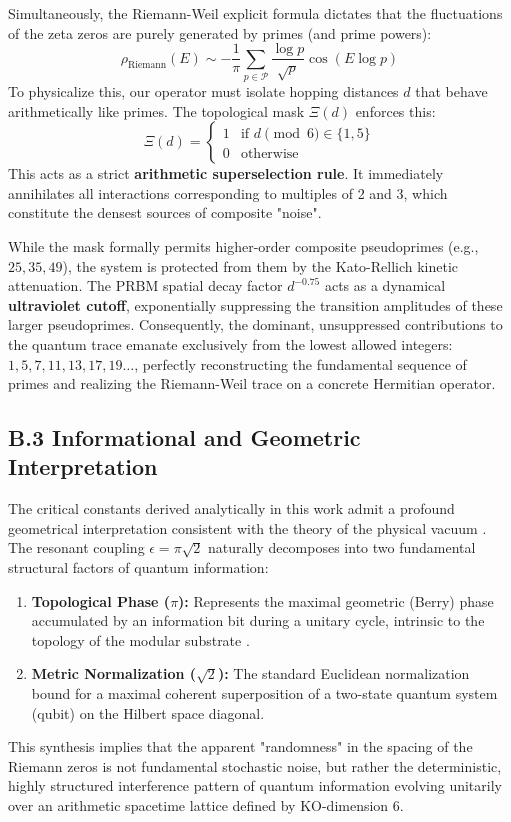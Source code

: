 \documentclass[prl,aps,floatfix,superscriptaddress,10pt]{revtex4-2}
\begin{document}
Simultaneously, the Riemann-Weil explicit formula dictates that the fluctuations of the zeta zeros are purely generated by primes (and prime powers):
\begin{equation}
\rho_{\text{Riemann}}(E) \sim -\frac{1}{\pi} \sum_{p \in \mathcal{P}} \frac{\log p}{\sqrt{p}} \cos(E \log p)
\end{equation}
To physicalize this, our operator must isolate hopping distances $d$ that behave arithmetically like primes. The topological mask $\Xi(d)$ enforces this:
\begin{equation}
\Xi(d) = \begin{cases} 1 & \text{if } d \pmod 6 \in \{1, 5\} \\ 0 & \text{otherwise} \end{cases}
\end{equation}
This acts as a strict \textbf{arithmetic superselection rule}. It immediately annihilates all interactions corresponding to multiples of 2 and 3, which constitute the densest sources of composite "noise". 

While the mask formally permits higher-order composite pseudoprimes (e.g., $25, 35, 49$), the system is protected from them by the Kato-Rellich kinetic attenuation. The PRBM spatial decay factor $d^{-0.75}$ acts as a dynamical \textbf{ultraviolet cutoff}, exponentially suppressing the transition amplitudes of these larger pseudoprimes. Consequently, the dominant, unsuppressed contributions to the quantum trace emanate exclusively from the lowest allowed integers: $1, 5, 7, 11, 13, 17, 19\dots$, perfectly reconstructing the fundamental sequence of primes and realizing the Riemann-Weil trace on a concrete Hermitian operator.

\subsection{B.3 Informational and Geometric Interpretation}

The critical constants derived analytically in this work admit a profound geometrical interpretation consistent with the theory of the physical vacuum \cite{PeinadorGenesis, PeinadorPi}. The resonant coupling $\epsilon = \pi\sqrt{2}$ naturally decomposes into two fundamental structural factors of quantum information:
\begin{enumerate}
    \item \textbf{Topological Phase ($\pi$):} Represents the maximal geometric (Berry) phase accumulated by an information bit during a unitary cycle, intrinsic to the topology of the modular substrate \cite{PeinadorPi}.
    \item \textbf{Metric Normalization ($\sqrt{2}$):} The standard Euclidean normalization bound for a maximal coherent superposition of a two-state quantum system (qubit) on the Hilbert space diagonal.
\end{enumerate}
This synthesis implies that the apparent "randomness" in the spacing of the Riemann zeros is not fundamental stochastic noise, but rather the deterministic, highly structured interference pattern of quantum information evolving unitarily over an arithmetic spacetime lattice defined by KO-dimension 6.
\end{document}
